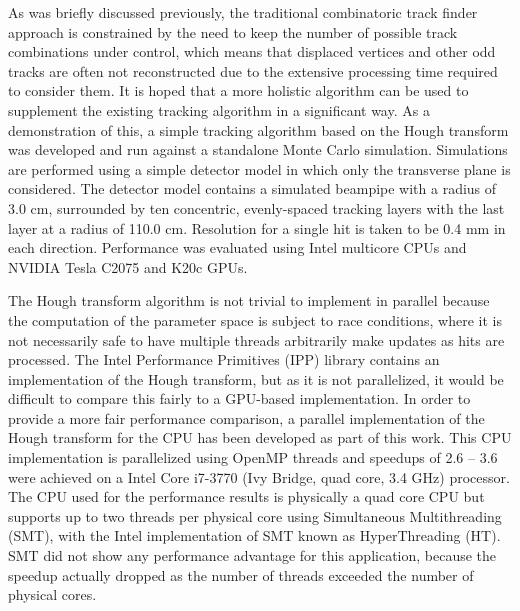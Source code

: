 \documentclass{JINST}
\begin{document}
As was briefly discussed previously, the traditional combinatoric track finder approach is constrained by the need to
keep the number of possible track combinations under control, which means that displaced vertices and other odd tracks
are often not reconstructed due to the extensive processing time required to consider them.
It is hoped that a more holistic algorithm can be used to supplement the existing
tracking algorithm in a significant way.  As a demonstration of this, a simple tracking algorithm based on
the Hough transform was developed and run against a standalone Monte Carlo simulation.
Simulations are performed using a simple detector model in which only the transverse plane is considered. The detector model 
contains a simulated beampipe with a radius of 3.0 cm, surrounded by ten concentric, evenly-spaced tracking layers with the last layer at a 
radius of 110.0 cm. Resolution for a single hit is taken to be 0.4 mm in each direction.
Performance was evaluated using Intel multicore CPUs and NVIDIA Tesla C2075 and K20c GPUs.

The Hough transform algorithm is not trivial to implement in parallel because the computation of the parameter space is
subject to race conditions, where it is not necessarily safe to have multiple threads arbitrarily make updates as hits
are processed.  The Intel Performance Primitives (IPP) library contains an implementation of the Hough transform, but as
it is not parallelized, it would be difficult to compare this fairly to a GPU-based implementation. In order to provide
a more fair performance comparison, a parallel implementation of the Hough transform for the CPU has been developed as
part of this work.  This CPU implementation is parallelized using OpenMP threads and speedups of 2.6 -- 3.6 were
achieved on a Intel Core i7-3770 (Ivy Bridge, quad core, 3.4 GHz) processor.  The CPU used for the performance results
is physically a quad core CPU but supports up to two threads per physical core using Simultaneous Multithreading (SMT),
with the Intel implementation of SMT known as HyperThreading (HT).  SMT did not show any performance advantage for this
application, because the speedup actually dropped as the number of threads exceeded the number of physical
cores.
\end{document}
